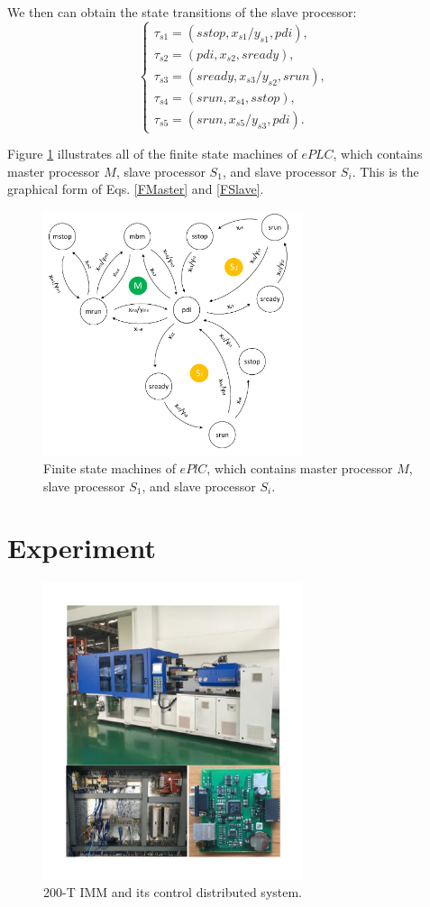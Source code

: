 \documentclass[journal,UTF8]{IEEEtran}
\begin{document}
 
We then can obtain the state transitions of the slave processor:
 \begin{equation}
 \left\{
 \begin{array}{l}
 \tau_{s1} = (sstop, x_{s1}/y_{s1}, pdi),\\
 \tau_{s2} = (pdi, x_{s2}, sready),\\
 \tau_{s3} = (sready, x_{s3}/y_{s2}, srun),\\
 \tau_{s4} = (srun, x_{s4}, sstop),\\
 \tau_{s5} = (srun, x_{s5}/y_{s3}, pdi).
 \end{array}
 \right.
 \end{equation}

Figure \ref{fig:state} illustrates all of the finite state machines of $ePLC$, which contains master processor $M$, slave processor $S_1$, and slave processor $S_i$. This is the graphical form of Eqs. \ref{FMaster} and \ref{FSlave}. 
 \begin{figure}
	\centering
	\includegraphics[width=3in]{fig/state.pdf}
	\caption{ Finite state machines of $ePlC$, which contains master processor $M$, slave processor $S_1$, and slave processor $S_i$.}
	\label{fig:state}
\end{figure}
\section{Experiment}
\label{Experiment}

\begin{figure}
	\centering
	\includegraphics[width=3in]{fig/FIG10.pdf}
	\caption{200-T IMM and its control distributed system.}
	\label{fig:IMM}
\end{figure}
\end{document}
